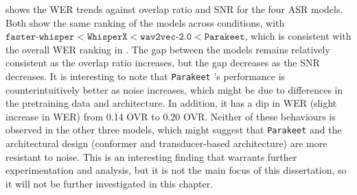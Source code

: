  shows the WER trends against overlap ratio and SNR for the four ASR models. Both show the same ranking of the models across conditions, with $\texttt{faster-whisper} < \texttt{WhisperX} < \texttt{wav2vec-2.0} < \texttt{Parakeet}$, which is consistent with the overall WER ranking in . The gap between the models remains relatively consistent as the overlap ratio increases, but the gap decreases as the SNR decreases. It is interesting to note that \texttt{Parakeet} 's performance is counterintuitively better as noise increases, which might be due to differences in the pretraining data and architecture. In addition, it has a dip in WER (slight increase in WER) from 0.14 OVR to 0.20 OVR. Neither of these behaviours is observed in the other three models, which might suggest that \texttt{Parakeet} and the architectural design (conformer and transducer-based architecture) are more resistant to noise. This is an interesting finding that warrants further experimentation and analysis, but it is not the main focus of this dissertation, so it will not be further investigated in this chapter.



